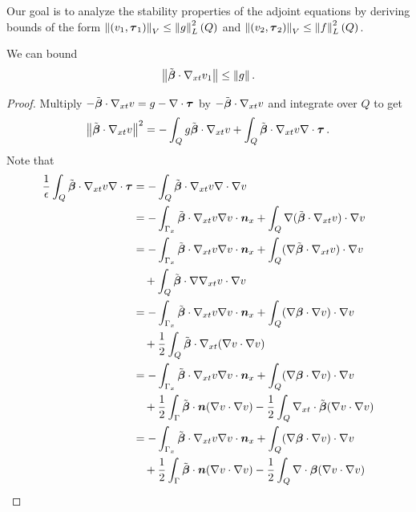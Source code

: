 \documentclass{article}
\begin{document}
Our goal is to analyze the stability properties of the adjoint equations by deriving bounds of the form
$\left\| (v_1,\boldsymbol\tau_1) \right\|_V\leq\left\| g \right\|_L^2\left( Q \right)$ and $\left\| (v_2,\boldsymbol\tau_2) \right\|_V\leq\left\| f \right\|_L^2\left( Q \right)$.

\begin{lemma}
\label{lem:convective}
We can bound
\[
\left\| \tilde{\boldsymbol\beta}\cdot\nabla_{xt} v_1 \right\|\leq \left\| g \right\|.
\]
\end{lemma}
\begin{proof}
Multiply $-\tilde{\boldsymbol\beta}\cdot\nabla_{xt} v=g-\nabla\cdot\boldsymbol\tau$ by $-\tilde{\boldsymbol\beta}\cdot\nabla_{xt} v$ and integrate over $Q$ to get
\begin{equation}
\label{eq:adj1}
\left\| \tilde{\boldsymbol\beta}\cdot\nabla_{xt} v \right\|^2=-\int_Q g\tilde{\boldsymbol\beta}\cdot\nabla_{xt} v+\int_Q\tilde{\boldsymbol\beta}\cdot\nabla_{xt} v\nabla\cdot\boldsymbol\tau\,.
\end{equation}
Note that
\begin{align*}
\frac{1}{\epsilon}\int_Q\tilde\bfbeta\cdot\Gradxt v\Div\bftau&=-\int_Q\tilde\bfbeta\cdot\Gradxt v\Div\Grad v \\
%
&=-\int_{\Gamma_x}\tilde\bfbeta\cdot\Gradxt v\Grad v\cdot\bfn_x
+\int_Q\Grad(\tilde\bfbeta\cdot\Gradxt v)\cdot\Grad v \\
%
&=-\int_{\Gamma_x}\tilde\bfbeta\cdot\Gradxt v\Grad v\cdot\bfn_x
+\int_Q(\Grad\tilde\bfbeta\cdot\Gradxt v)\cdot\Grad v\\
&\quad+\int_Q\tilde\bfbeta\cdot\Grad\Gradxt v\cdot\Grad v\\
%
&=-\int_{\Gamma_x}\tilde\bfbeta\cdot\Gradxt v\Grad v\cdot\bfn_x
+\int_Q(\Grad\bfbeta\cdot\Grad v)\cdot\Grad v\\
&\quad+\frac{1}{2}\int_Q\tilde\bfbeta\cdot\Gradxt(\Grad v\cdot\Grad v)\\
%
&=-\int_{\Gamma_x}\tilde\bfbeta\cdot\Gradxt v\Grad v\cdot\bfn_x
+\int_Q(\Grad\bfbeta\cdot\Grad v)\cdot\Grad v\\
&\quad+\frac{1}{2}\int_\Gamma\tilde\bfbeta\cdot\bfn(\Grad v\cdot\Grad v)
-\frac{1}{2}\int_Q\Divxt\tilde\bfbeta(\Grad v\cdot\Grad v)\\
%
&=-\int_{\Gamma_x}\tilde\bfbeta\cdot\Gradxt v\Grad v\cdot\bfn_x
+\int_Q(\Grad\bfbeta\cdot\Grad v)\cdot\Grad v\\
&\quad+\frac{1}{2}\int_\Gamma\tilde\bfbeta\cdot\bfn(\Grad v\cdot\Grad v)
-\frac{1}{2}\int_Q\Div\bfbeta(\Grad v\cdot\Grad v)\\
%

\end{align*}
\end{proof}
\end{document}
